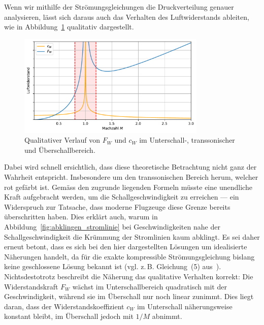 Wenn wir mithilfe der Strömungsgleichungen die Druckverteilung genauer analysieren, 
lässt sich daraus auch das Verhalten des Luftwiderstands ableiten, 
wie in Abbildung~\ref{fig:luftwiderstand} qualitativ dargestellt.
\begin{figure}
    \centering
    \includegraphics[width=0.8\textwidth]{papers/ueberschall/figures/Luftwiderstand_qual.pdf}
    \caption{Qualitativer Verlauf von $F_W$ und $c_W$ im Unterschall-, transsonischer und Überschallbereich.}
    \label{fig:luftwiderstand}
\end{figure}
Dabei wird schnell ersichtlich, dass diese theoretische 
Betrachtung nicht ganz der Wahrheit entspricht.
Insbesondere um den transsonischen Bereich herum, welcher rot gefärbt ist.
Gemäss den zugrunde liegenden Formeln müsste eine 
unendliche Kraft aufgebracht werden, 
um die Schallgeschwindigkeit zu erreichen — ein Widerspruch zur Tatsache, 
dass moderne Flugzeuge diese Grenze bereits überschritten haben.
Dies erklärt auch, warum in Abbildung~\ref{fig:abklingen_stromlinie} 
bei Geschwindigkeiten nahe der Schallgeschwindigkeit die Krümmung 
der Stromlinien kaum abklingt.
Es sei daher erneut betont, dass es sich bei den hier 
dargestellten Lösungen um idealisierte Näherungen handelt,
da für die exakte kompressible Strömungsgleichung bislang 
keine geschlossene Lösung bekannt ist 
(vgl. z.\,B. Gleichung~(5) aus~\cite{Ackeret1928}).
Nichtsdestotrotz beschreibt die Näherung das qualitative Verhalten korrekt:
Die Widerstandskraft $F_W$ wächst im Unterschallbereich quadratisch mit 
der Geschwindigkeit, während sie im Überschall nur noch linear zunimmt. 
Dies liegt daran, dass der Widerstandskoeffizient $c_W$ im Unterschall 
näherungsweise konstant bleibt, im Überschall 
jedoch mit $1/M$ abnimmt.

